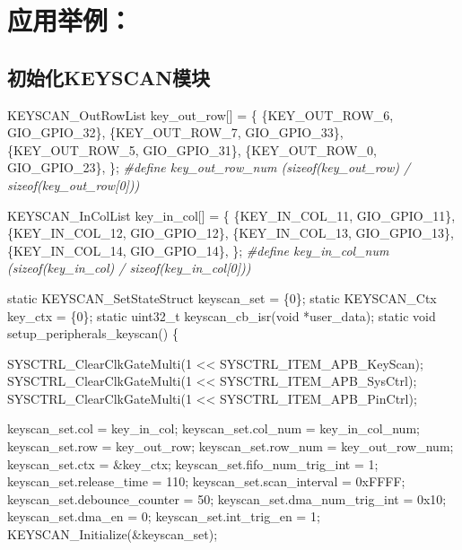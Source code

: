 \documentclass[
  12pt,
]{book}
\newenvironment{Shaded}{\begin{snugshade}}{\end{snugshade}}
\newcommand{\BaseNTok}[1]{\textcolor[rgb]{0.00,0.00,0.81}{#1}}
\newcommand{\DataTypeTok}[1]{\textcolor[rgb]{0.13,0.29,0.53}{#1}}
\newcommand{\DecValTok}[1]{\textcolor[rgb]{0.00,0.00,0.81}{#1}}
\newcommand{\NormalTok}[1]{#1}
\newcommand{\PreprocessorTok}[1]{\textcolor[rgb]{0.56,0.35,0.01}{\textit{#1}}}
\begin{document}
\hypertarget{ux5e94ux7528ux4e3eux4f8b}{%
\section{应用举例：}\label{ux5e94ux7528ux4e3eux4f8b}}

\hypertarget{ux521dux59cbux5316keyscanux6a21ux5757}{%
\subsection{初始化KEYSCAN模块}\label{ux521dux59cbux5316keyscanux6a21ux5757}}

\begin{Shaded}
\begin{Highlighting}[]
\NormalTok{KEYSCAN_OutRowList key_out_row[] = \{}
\NormalTok{    \{KEY_OUT_ROW_6, GIO_GPIO_32\},}
\NormalTok{    \{KEY_OUT_ROW_7, GIO_GPIO_33\},}
\NormalTok{    \{KEY_OUT_ROW_5, GIO_GPIO_31\},}
\NormalTok{    \{KEY_OUT_ROW_0, GIO_GPIO_23\},}
\NormalTok{\};}
\PreprocessorTok{#define key_out_row_num (sizeof(key_out_row) / sizeof(key_out_row[0]))}

\NormalTok{KEYSCAN_InColList key_in_col[] = \{}
\NormalTok{    \{KEY_IN_COL_11, GIO_GPIO_11\},}
\NormalTok{    \{KEY_IN_COL_12, GIO_GPIO_12\},}
\NormalTok{    \{KEY_IN_COL_13, GIO_GPIO_13\},}
\NormalTok{    \{KEY_IN_COL_14, GIO_GPIO_14\},}
\NormalTok{\};}
\PreprocessorTok{#define key_in_col_num (sizeof(key_in_col) / sizeof(key_in_col[0]))}

\DataTypeTok{static}\NormalTok{ KEYSCAN_SetStateStruct keyscan_set = \{}\DecValTok{0}\NormalTok{\};}
\DataTypeTok{static}\NormalTok{ KEYSCAN_Ctx key_ctx = \{}\DecValTok{0}\NormalTok{\};}
\DataTypeTok{static} \DataTypeTok{uint32_t}\NormalTok{ keyscan_cb_isr(}\DataTypeTok{void}\NormalTok{ *user_data);}
\DataTypeTok{static} \DataTypeTok{void}\NormalTok{ setup_peripherals_keyscan()}
\NormalTok{\{}

\NormalTok{    SYSCTRL_ClearClkGateMulti(}\DecValTok{1}\NormalTok{ << SYSCTRL_ITEM_APB_KeyScan);}
\NormalTok{    SYSCTRL_ClearClkGateMulti(}\DecValTok{1}\NormalTok{ << SYSCTRL_ITEM_APB_SysCtrl);}
\NormalTok{    SYSCTRL_ClearClkGateMulti(}\DecValTok{1}\NormalTok{ << SYSCTRL_ITEM_APB_PinCtrl);}

\NormalTok{    keyscan_set.col = key_in_col;}
\NormalTok{    keyscan_set.col_num = key_in_col_num;}
\NormalTok{    keyscan_set.row = key_out_row;}
\NormalTok{    keyscan_set.row_num = key_out_row_num;}
\NormalTok{    keyscan_set.ctx = &key_ctx;}
\NormalTok{    keyscan_set.fifo_num_trig_int = }\DecValTok{1}\NormalTok{;}
\NormalTok{    keyscan_set.release_time = }\DecValTok{110}\NormalTok{;}
\NormalTok{    keyscan_set.scan_interval = }\BaseNTok{0xFFFF}\NormalTok{;}
\NormalTok{    keyscan_set.debounce_counter = }\DecValTok{50}\NormalTok{;}
\NormalTok{    keyscan_set.dma_num_trig_int = }\BaseNTok{0x10}\NormalTok{;}
\NormalTok{    keyscan_set.dma_en = }\DecValTok{0}\NormalTok{;}
\NormalTok{    keyscan_set.int_trig_en = }\DecValTok{1}\NormalTok{;}
\NormalTok{    KEYSCAN_Initialize(&keyscan_set);}


\end{Highlighting}
\end{Shaded}
\end{document}

